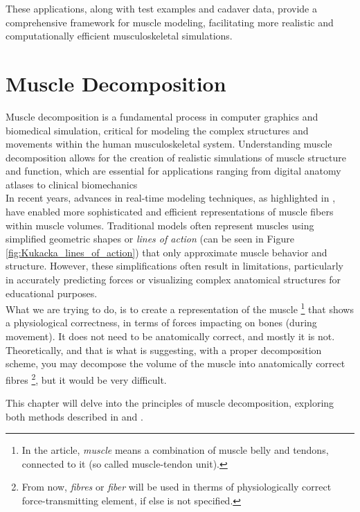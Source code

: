 \documentclass[english, bc, kiv, he, iso690alph, pdf, viewonly]{fasthesis}
\begin{document}
These applications, along with test examples and cadaver data, provide a comprehensive framework for muscle modeling, facilitating more realistic and computationally efficient musculoskeletal simulations.


\chapter{Muscle Decomposition}

Muscle decomposition is a fundamental process in computer graphics and biomedical simulation, critical for modeling the complex structures and movements within the human musculoskeletal system. Understanding muscle decomposition allows for the creation of realistic simulations of muscle structure and function, which are essential for applications ranging from digital anatomy atlases to clinical biomechanics\\

In recent years, advances in real-time modeling techniques, as highlighted in \cite{KK14}, have enabled more sophisticated and efficient representations of muscle fibers within muscle volumes. Traditional models often represent muscles using simplified geometric shapes or \textit{lines of action} (can be seen in Figure \ref{fig:Kukacka_lines_of_action}) that only approximate muscle behavior and structure. However, these simplifications often result in limitations, particularly in accurately predicting forces or visualizing complex anatomical structures for educational purposes. \\

What we are trying to do, is to create a representation of the muscle \footnote{In the article, \textsl{muscle} means a combination of muscle belly and tendons, connected to it (so called muscle-tendon unit).} that shows a physiological correctness, in terms of forces impacting on bones (during movement). It does not need to be anatomically correct, and mostly it is not. Theoretically, and that is what \cite{KK14} is suggesting, with a proper decomposition scheme, you may decompose the volume of the muscle into anatomically correct fibres \footnote{From now, \textsl{fibres} or \textsl{fiber} will be used in therms of physiologically correct force-transmitting element, if else is not specified.}, but it would be very difficult. \\

\newpage

This chapter will delve into the principles of muscle decomposition, exploring both methods described in \cite{KK14} and \cite{HOA23}.
\end{document}

